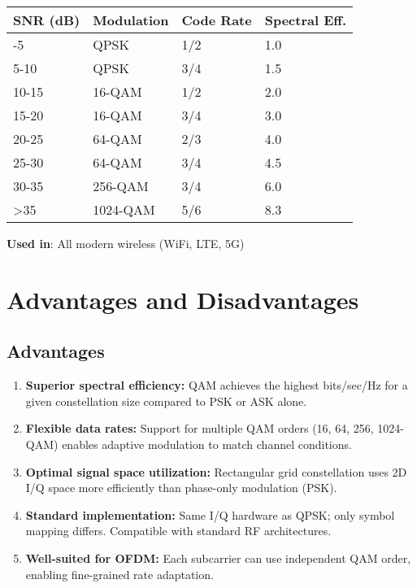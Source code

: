 {\def\LTcaptype{} %
\begin{longtable}[]{@{}llll@{}}
\toprule\noalign{}
SNR (dB) & Modulation & Code Rate & Spectral Eff. \\
\midrule\noalign{}
\endhead
\bottomrule\noalign{}
\endlastfoot
0-5 & QPSK & 1/2 & 1.0 \\
5-10 & QPSK & 3/4 & 1.5 \\
10-15 & 16-QAM & 1/2 & 2.0 \\
15-20 & 16-QAM & 3/4 & 3.0 \\
20-25 & 64-QAM & 2/3 & 4.0 \\
25-30 & 64-QAM & 3/4 & 4.5 \\
30-35 & 256-QAM & 3/4 & 6.0 \\
\textgreater35 & 1024-QAM & 5/6 & 8.3 \\
\end{longtable}
}

\textbf{Used in}: All modern wireless (WiFi, LTE, 5G)

\section{Advantages and Disadvantages}

\subsection*{Advantages}

\begin{enumerate}
\item \textbf{Superior spectral efficiency:} QAM achieves the highest bits/sec/Hz for a given constellation size compared to PSK or ASK alone.

\item \textbf{Flexible data rates:} Support for multiple QAM orders (16, 64, 256, 1024-QAM) enables adaptive modulation to match channel conditions.

\item \textbf{Optimal signal space utilization:} Rectangular grid constellation uses 2D I/Q space more efficiently than phase-only modulation (PSK).

\item \textbf{Standard implementation:} Same I/Q hardware as QPSK; only symbol mapping differs. Compatible with standard RF architectures.

\item \textbf{Well-suited for OFDM:} Each subcarrier can use independent QAM order, enabling fine-grained rate adaptation.
\end{enumerate}

